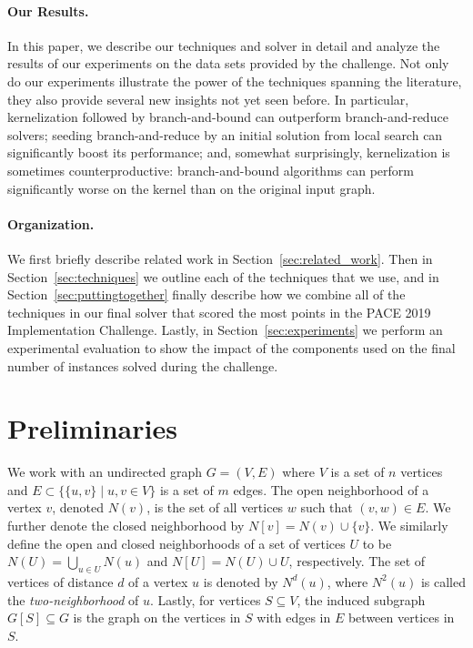 \documentclass[twoside,leqno,twocolumn]{article}
\newcommand{\csch}[1]{{\color{red} CS: #1}}
\begin{document}
\paragraph*{Our Results.}
In this paper, we describe our techniques and solver in detail and analyze the results of our experiments on the data sets provided by the challenge.
Not only do our experiments illustrate the power of the techniques spanning the literature, they also provide several new insights not yet seen before.
In particular, kernelization followed by branch-and-bound can outperform branch-and-reduce solvers; seeding branch-and-reduce by an initial solution from local search can significantly boost its performance; and, somewhat surprisingly, kernelization is sometimes counterproductive: branch-and-bound algorithms can perform significantly worse on the kernel than on the original input graph.

\paragraph*{Organization.}
We first briefly describe related work in Section~\ref{sec:related_work}. Then in Section~\ref{sec:techniques} we outline each of the techniques that we use, and in Section~\ref{sec:puttingtogether} finally describe how we combine all of the techniques in our final solver that scored the most points in the PACE 2019 Implementation Challenge. Lastly, in Section~\ref{sec:experiments} we perform an experimental evaluation to show the impact of the components used on the final number of instances solved during the challenge.

\section{Preliminaries}
\label{sec:preliminaries}
We work with an undirected graph $G = (V,E)$ where $V$ is a set of $n$ vertices and $E\subset \{\{u,v\}\mid u,v\in V\}$ is a set of $m$ edges. The open neighborhood of a vertex $v$, denoted $N(v)$, is the set of all vertices $w$ such that $(v,w)\in E$. We further denote the closed neighborhood by $N[v]=N(v)\cup\{v\}$. We similarly define the open and closed neighborhoods of a set of vertices $U$ to be $N(U) = \bigcup_{u\in U}N(u)$ and $N[U] = N(U) \cup U$, respectively. The set of vertices of distance $d$ of a vertex $u$ is denoted by $N^d(u)$, where $N^2(u)$ is called the \emph{two-neighborhood} of $u$. Lastly, for vertices $S\subseteq V$, the induced subgraph $G[S]\subseteq G$ is the graph on the vertices in $S$ with edges in $E$ between vertices in $S$.
\end{document}
